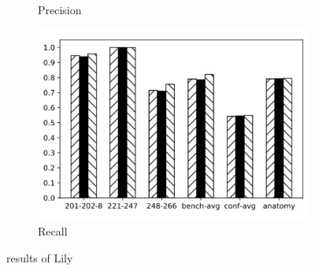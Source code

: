 \documentclass[twoside]{article}
\begin{document}
\begin{figure}[htb!]
\begin{subfigure}{0.3\textwidth}
\caption{Precision}
\label{fig:MultiRegress_Lily_P}
\end{subfigure}
\begin{subfigure}{0.3\textwidth}
	\centering
\includegraphics[width=\textwidth]{data_figs/MulRegress_Lily_R.pdf}
\caption{Recall}
\label{fig:MultiRegress_Lily_R}
\end{subfigure}
\caption{results of Lily}
\end{figure}

\end{document}
